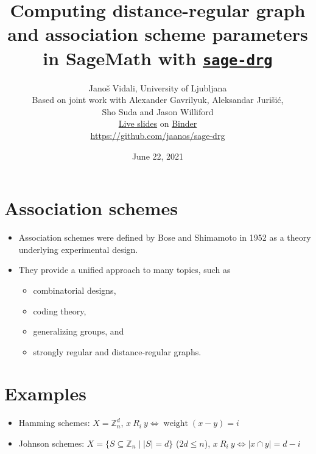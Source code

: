 \documentclass[11pt]{article}
\title{Computing distance-regular graph and association scheme parameters in SageMath with \href{https://github.com/jaanos/sage-drg}{\texttt{sage-drg}}}
\author{Janoš Vidali, University of Ljubljana \\[5mm]
    Based on joint work with Alexander Gavrilyuk, Aleksandar Jurišić, \\ Sho Suda and Jason Williford \\[5mm]
    \href{https://mybinder.org/v2/gh/jaanos/sage-drg/master?filepath=jupyter/2021-06-22-8ecm/8ECM-sage-drg.ipynb}{Live slides} on \href{https://mybinder.org}{Binder} \\[2mm]
    \url{https://github.com/jaanos/sage-drg}}
\date{June 22, 2021}
\providecommand{\tightlist}{%
      \setlength{\itemsep}{0pt}\setlength{\parskip}{0pt}}
\renewcommand{\textbf}[1]{\textcolor[rgb]{1,0,0}{{#1}}}
\renewcommand{\emph}[1]{\textcolor[rgb]{0,0,1}{{#1}}}
\renewcommand{\sout}[1]{\textcolor[rgb]{0,0.5,0}{{#1}}}
\begin{document}
    
    \maketitle

    \hypertarget{association-schemes}{%
\section*{Association schemes}\label{association-schemes}}

\begin{itemize}
\tightlist
\item
  \textbf{Association schemes} were defined by \emph{Bose} and
  \emph{Shimamoto} in \emph{1952} as a theory underlying
  \textbf{experimental design}.
\item
  They provide a \sout{unified approach} to many topics, such as

  \begin{itemize}
  \tightlist
  \item
    \emph{combinatorial designs},
  \item
    \emph{coding theory},
  \item
    generalizing \emph{groups}, and
  \item
    \emph{strongly regular} and \emph{distance-regular graphs}.
  \end{itemize}
\end{itemize}

\newpage

    \hypertarget{examples}{%
\section*{Examples}\label{examples}}

\begin{itemize}
\tightlist
\item
  \emph{Hamming schemes}: \textbf{\(X = \mathbb{Z}_n^d\)},
  \textbf{\(x \ R_i \ y \Leftrightarrow \operatorname{weight}(x-y) = i\)}
\item
  \emph{Johnson schemes}:
  \textbf{\(X = \{S \subseteq \mathbb{Z}_n \mid |S| = d\}\)}
  (\(2d \le n\)),
  \textbf{\(x \ R_i \ y \Leftrightarrow |x \cap y| = d-i\)}
\end{itemize}

    \begin{center}
\end{center}
{ \hspace*{\fill} \\}
\end{document}
